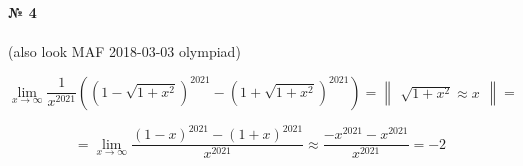 \documentclass{article}
\begin{document}
\textbf{№ 4} 
\\
\\ (also look MAF 2018-03-03 olympiad)

$$ \lim_{x\to\infty} \frac{1}{x^{2021}}\left((1-\sqrt{1+x^2})^{2021}-(1+\sqrt{1+x^2})^{2021} \right) 
= \begin{Vmatrix} \sqrt{1+x^2} \approx x \end{Vmatrix} = $$

$$ = \lim_{x\to\infty} \frac{(1-x)^{2021}-(1+x)^{2021}}{x^{2021}} 
\approx \frac{-x^{2021}-x^{2021}}{x^{2021}} 
= -2 $$
\end{document}
